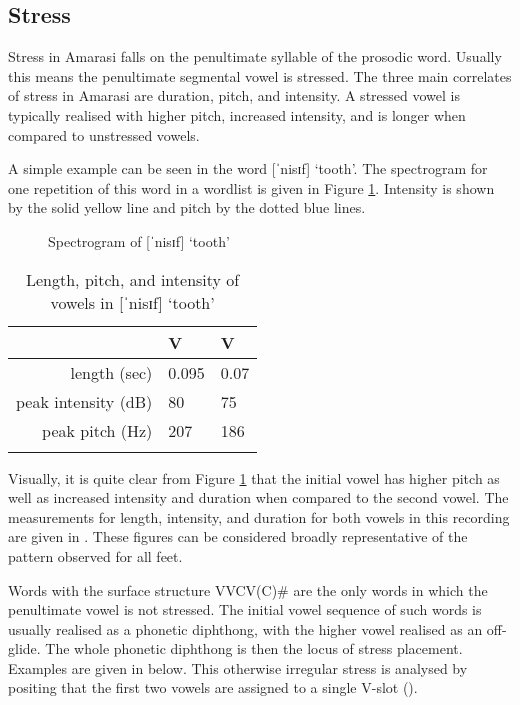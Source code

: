 \subsection{Stress}\label{sec:Str}
Stress in Amarasi falls on the penultimate syllable of the prosodic word.
Usually this means the penultimate segmental vowel is stressed.
The three main correlates of stress in Amarasi are duration, pitch, and intensity.
A stressed vowel is typically realised with higher pitch,
increased intensity, and is longer when compared to unstressed vowels.

A simple example can be seen in the word  {\ra} [ˈnisɪf] {} `tooth'.
The spectrogram for one repetition of this word in a wordlist is given in Figure \ref{fig:SpeNis}.
Intensity is shown by the solid yellow line and pitch by the dotted blue lines.

\begin{figure}[h]
	\centering\setlength\fboxsep{-0.5pt}\setlength\fboxrule{0.75pt}
			\caption{Spectrogram of [ˈnisɪf] `tooth'}
	\label{fig:SpeNis}
\end{figure}

\begin{table}[ht]
	\centering\caption{Length, pitch, and intensity of vowels in [ˈnisɪf] `tooth'}\label{tab:LenPitIntVowNis}
		\begin{tabular}{rll} \lsptoprule
										& V\sub{1}& V\sub{2} \\ \midrule
			length (sec)	&   0.095	&   0.07 \\ 
			peak intensity (dB)&  80	&  75 \\ 
			peak pitch (Hz)		& 207	& 186 \\ \lspbottomrule
		\end{tabular}
\end{table}

Visually, it is quite clear from Figure \ref{fig:SpeNis} that the initial vowel has higher pitch
as well as increased intensity and duration when compared to the second vowel.
The measurements for length, intensity, and duration for both vowels
in this recording are given in .
These figures can be considered broadly representative of the pattern observed for all feet.

Words with the surface structure VVCV(C){\#}
are the only words in which the penultimate vowel is not stressed.
The initial vowel sequence of such words is usually realised as a phonetic diphthong,
with the higher vowel realised as an off-glide.
The whole phonetic diphthong is then the locus of stress placement.
Examples are given in  below.
This otherwise irregular stress is analysed by positing 
that the first two vowels are assigned to a single V-slot ().

